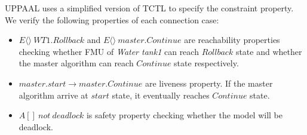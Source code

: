 UPPAAL uses a simplified version of TCTL \cite{BouchenebGR09} to specify the constraint property. We verify the following properties of each connection case:
\begin{itemize}
\item
$E\langle\rangle~WT1.Rollback$ and $E\langle\rangle~master.Continue$ are reachability properties checking whether FMU of \emph{Water tank1} can reach $Rollback$ state and whether the master algorithm can reach $Continue$ state respectively.
\item
$master.start \rightarrow master.Continue$ are liveness property. If the master algorithm arrive at $start$ state, it eventually reaches $Continue$ state.
\item 
$A[]~not~deadlock$ is safety property checking whether the model will be deadlock.
\end{itemize}

